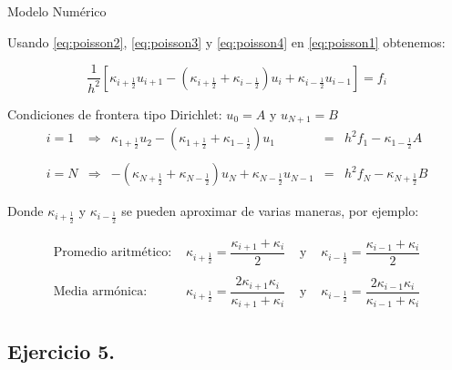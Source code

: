 \documentclass{beamer}
\begin{document}
\begin{frame}{Modelo Numérico}
	
{\footnotesize 
	
	Usando \eqref{eq:poisson2}, \eqref{eq:poisson3} y \eqref{eq:poisson4} en \eqref{eq:poisson1}
	obtenemos:
	
	\begin{equation}
	\boxed{
	\dfrac{1}{h^2} \left[
	\kappa_{i+\frac{1}{2}} u_{i+1} - 
	(\kappa_{i+\frac{1}{2}} + \kappa_{i-\frac{1}{2}}) u_{i} +
	\kappa_{i-\frac{1}{2}} u_{i-1}
	\right] = f_i
	}
	\end{equation}
	
	Condiciones de frontera tipo Dirichlet: $u_0 = A$ y $u_{N+1} = B$
	\[
	\begin{array}{ccccc}
	i = 1 & \Longrightarrow &
	\kappa_{1+\frac{1}{2}} u_{2} - 
	(\kappa_{1+\frac{1}{2}} + \kappa_{1-\frac{1}{2}}) u_{1} & = & h^2 f_1 - \kappa_{1-\frac{1}{2}} A \\ \\
	i = N & \Longrightarrow &
	- (\kappa_{N+\frac{1}{2}} + \kappa_{N-\frac{1}{2}}) u_{N} +
	\kappa_{N-\frac{1}{2}} u_{N-1} & = & h^2 f_N - \kappa_{N+\frac{1}{2}} B
	\end{array}
	\]
	
	\noindent
	Donde $\kappa_{i+\frac{1}{2}}$ y $\kappa_{i-\frac{1}{2}}$ se pueden aproximar de varias maneras, por ejemplo:
	
	\[
	\begin{array}{cccc}
	\text{Promedio aritmético: } &
	\kappa_{i+\frac{1}{2}} = \dfrac{ \kappa_{i+1} + \kappa_{i}}{2} & \text{ y } &
	\kappa_{i-\frac{1}{2}} = \dfrac{ \kappa_{i-1} + \kappa_{i}}{2} \\ \\
	\text{Media armónica: } &
	\kappa_{i+\frac{1}{2}} = \dfrac{ 2 \kappa_{i+1} \kappa_{i}}{\kappa_{i+1} + \kappa_{i}} & \text{ y } &
	\kappa_{i-\frac{1}{2}} = \dfrac{ 2 \kappa_{i-1} \kappa_{i}}{\kappa_{i-1} + \kappa_{i}} 
	\end{array}
	\]
	
}
	
\end{frame}


\subsection{Ejercicio 5.}
\end{document}
